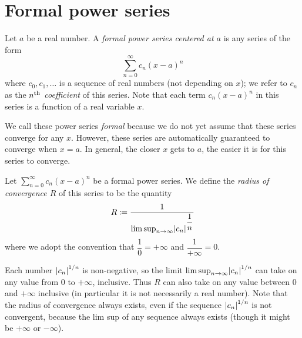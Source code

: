 \section{Formal power series}\label{ii:sec:4.1}

\begin{defn}\label{ii:4.1.1}
  Let \(a\) be a real number.
  A \emph{formal power series centered at \(a\)} is any series of the form
  \[
    \sum_{n = 0}^\infty c_n (x - a)^n
  \]
  where \(c_0, c_1, \dots\) is a sequence of real numbers (not depending on \(x\));
  we refer to \(c_n\) as the \emph{\(n^{\operatorname{th}}\) coefficient} of this series.
  Note that each term \(c_n (x - a)^n\) in this series is a function of a real variable \(x\).
\end{defn}

\begin{note}
  We call these power series \emph{formal} because we do not yet assume that these series converge for any \(x\).
  However, these series are automatically guaranteed to converge when \(x = a\).
  In general, the closer \(x\) gets to \(a\), the easier it is for this series to converge.
\end{note}

\setcounter{thm}{2}
\begin{defn}\label{ii:4.1.3}
  Let \(\sum_{n = 0}^\infty c_n (x - a)^n\) be a formal power series.
  We define the \emph{radius of convergence \(R\)} of this series to be the quantity
  \[
    R \coloneqq \dfrac{1}{\limsup_{n \to \infty} \abs{c_n}^{\dfrac{1}{n}}}
  \]
  where we adopt the convention that \(\dfrac{1}{0} = +\infty\) and \(\dfrac{1}{+\infty} = 0\).
\end{defn}

\begin{rmk}\label{ii:4.1.4}
  Each number \(\left\lvert c_n\right\rvert^{1 / n}\) is non-negative, so the limit \(\limsup_{n \to \infty} \abs{c_n}^{1 / n}\) can take on any value from \(0\) to \(+\infty\), inclusive.
  Thus \(R\) can also take on any value between \(0\) and \(+\infty\) inclusive
  (in particular it is not necessarily a real number).
  Note that the radius of convergence always exists, even if the sequence \(\left\lvert c_n\right\rvert^{1 / n}\) is not convergent, because the lim sup of any sequence always exists
  (though it might be \(+\infty\) or \(-\infty\)).
\end{rmk}

